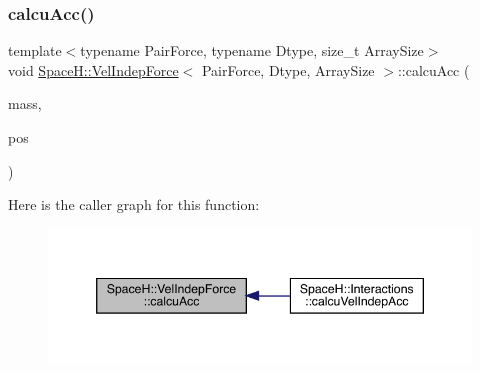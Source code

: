\subsubsection{\texorpdfstring{calcu\+Acc()}{calcuAcc()}\hspace{0.1cm}{\footnotesize\ttfamily [1/2]}}
{\footnotesize\ttfamily template$<$typename Pair\+Force, typename Dtype, size\+\_\+t Array\+Size$>$ \\
void \mbox{\hyperlink{struct_space_h_1_1_vel_indep_force}{Space\+H\+::\+Vel\+Indep\+Force}}$<$ Pair\+Force, Dtype, Array\+Size $>$\+::calcu\+Acc (\begin{DoxyParamCaption}\item[{const \mbox{\hyperlink{struct_space_h_1_1_vel_indep_force_a05d04af454b5217024f5fff45d7e4d32}{Scalar\+Array}} \&}]{mass,  }\item[{const \mbox{\hyperlink{struct_space_h_1_1_vel_indep_force_a6b4e8ca988b015e7f956f015991ecd80}{Vector\+Array}} \&}]{pos }\end{DoxyParamCaption})\hspace{0.3cm}{\ttfamily [inline]}}

Here is the caller graph for this function\+:
\nopagebreak
\begin{figure}[H]
\begin{center}
\leavevmode
\includegraphics[width=346pt]{struct_space_h_1_1_vel_indep_force_a38036f5de71884159cbb513883379ae9_icgraph}
\end{center}
\end{figure}
\mbox{\label{struct_space_h_1_1_vel_indep_force_a82661f96988b6dfa6e7b13db4906cd57}} 
